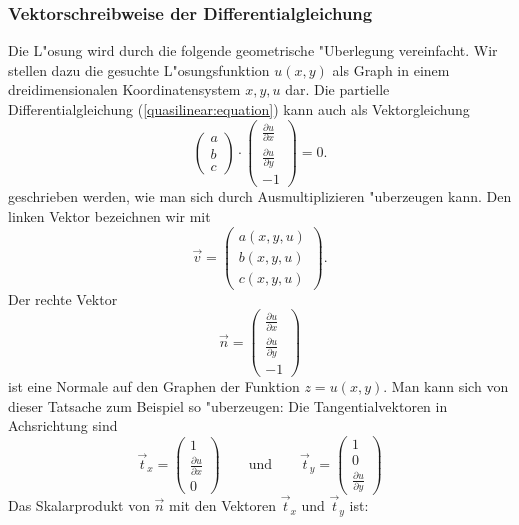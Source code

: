 \subsubsection{Vektorschreibweise der Differentialgleichung}
Die L"osung wird durch die folgende geometrische "Uberlegung vereinfacht.
Wir stellen dazu die gesuchte L"osungsfunktion $u(x,y)$ als Graph
in einem dreidimensionalen Koordinatensystem $x,y,u$ dar.
Die partielle Differentialgleichung (\ref{quasilinear:equation})
kann auch als Vektorgleichung
\begin{equation}
\begin{pmatrix}a\\b\\c\end{pmatrix}
\cdot
\begin{pmatrix}
\frac{\partial u}{\partial x}\\
\frac{\partial u}{\partial y}\\
-1
\end{pmatrix}
=0.
\label{quasilinear:vektorform}
\end{equation}
geschrieben werden, wie man sich durch Ausmultiplizieren "uberzeugen
kann.
Den linken Vektor bezeichnen wir mit
\[
\vec v=\begin{pmatrix}
a(x,y,u)\\
b(x,y,u)\\
c(x,y,u)
\end{pmatrix}.
\]
Der rechte Vektor
\[
\vec n=
\begin{pmatrix}
\frac{\partial u}{\partial x}\\
\frac{\partial u}{\partial y}\\
-1
\end{pmatrix}
\]
ist eine Normale auf den Graphen der Funktion
$z=u(x,y)$. Man kann sich von dieser Tatsache zum Beispiel so 
"uberzeugen: Die Tangentialvektoren in Achsrichtung sind
\[
\vec t_x
=
\begin{pmatrix}1\\\frac{\partial u}{\partial x}\\0\end{pmatrix}
\qquad
\text{und}
\qquad
\vec t_y
=
\begin{pmatrix}1\\0\\\frac{\partial u}{\partial y}\end{pmatrix}
\]
Das Skalarprodukt von $\vec n$ mit den Vektoren $\vec t_x$ und $\vec t_y$
ist:
